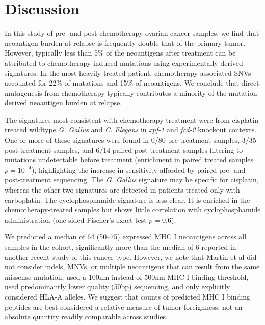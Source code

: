 \section*{Discussion}

In this study of pre- and post-chemotherapy ovarian cancer samples, we find that neoantigen burden at relapse is frequently double that of the primary tumor. However, typically less than 5\% of the neoantigens after treatment can be attributed to chemotherapy-induced mutations using experimentally-derived signatures. In the most heavily treated patient, chemotherapy-associated SNVs accounted for 22\% of mutations and 15\% of neoantigens. We conclude that direct mutagenesis from chemotherapy typically contributes a minority of the mutation-derived neoantigen burden at relapse.

The signatures most consistent with chemotherapy treatment were from cisplatin-treated wildtype \textit{G. Gallus} and \textit{C. Elegans} in \textit{xpf-1} and \textit{fcd-2} knockout contexts. One or more of these signatures were found in 0/80 pre-treatment samples, 3/35 post-treatment samples, and 6/14 paired post-treatment samples filtering to mutations undetectable before treatment (enrichment in paired treated samples $p=10^{-4}$), highlighting the increase in sensitivity afforded by paired pre- and post-treatment sequencing. The \textit{G. Gallus} signature may be specific for cisplatin, whereas the other two signatures are detected in patients treated only with carboplatin. The cyclophosphamide signature is less clear. It is enriched in the chemotherapy-treated samples but shows little correlation with cyclophosphamide administration (one-sided Fischer's exact test $p=0.6$).


We predicted a median of 64 (50--75) expressed MHC I neoantigens across all samples in the cohort, significantly more than the median of 6 reported in another recent study of this cancer type\cite{Martin_2016}. However, we note that Martin et al did not consider indels, MNVs, or multiple neoantigens that can result from the same missense mutation, used a 100nm instead of 500nm MHC I binding threshold, used predominantly lower quality (50bp) sequencing, and only explicitly considered HLA-A alleles. We suggest that counts of predicted MHC I binding peptides are best considered a relative measure of tumor foreignness, not an absolute quantity readily comparable across studies.

